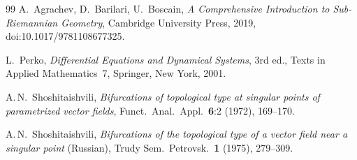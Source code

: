 \documentclass[11pt,reqno]{amsart}
\theoremstyle{plain}
\theoremstyle{definition}
\theoremstyle{remark}
\begin{document}
\begin{thebibliography}{99}
 A.~Agrachev, D.~Barilari, U.~Boscain,
  \emph{A Comprehensive Introduction to Sub-Riemannian Geometry},
  Cambridge University Press, 2019, doi:10.1017/9781108677325.

 L.~Perko,
  \emph{Differential Equations and Dynamical Systems}, 3rd ed., Texts in Applied Mathematics~7,
  Springer, New York, 2001.

 A.\,N.~Shoshitaishvili,
  \emph{Bifurcations of topological type at singular points of parametrized vector fields},
  Funct.\ Anal.\ Appl.\ \textbf{6}:2 (1972), 169--170.

 A.\,N.~Shoshitaishvili,
  \emph{Bifurcations of the topological type of a vector field near a singular
  point} \textup{(Russian)}, Trudy Sem.\ Petrovsk.\ \textbf{1} (1975), 279--309.

\end{thebibliography}

\label{pg:last}
\end{document}
